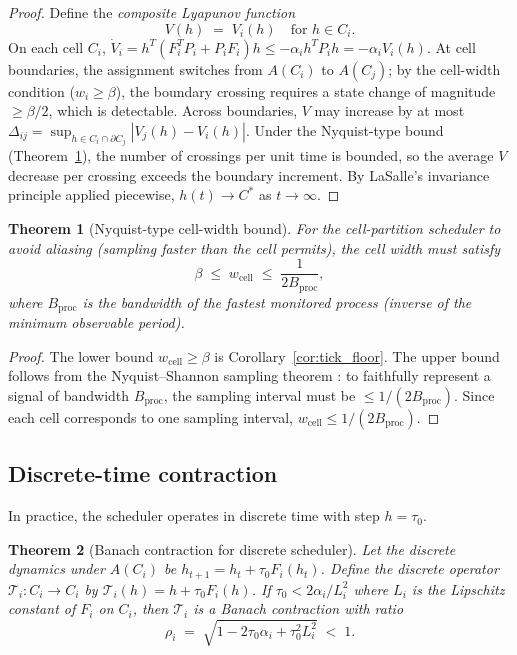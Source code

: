 \documentclass[11pt,twocolumn,a4paper]{article}
\theoremstyle{plain}
\newtheorem{theorem}{Theorem}[section]
\theoremstyle{definition}
\theoremstyle{remark}
\newcommand{\T}{\mathcal{T}}
\newcommand{\tick}{\tau_0}
\newcommand{\floor}{\beta}
\newcommand{\cell}{\mathrm{cell}}
\newcommand{\Lyap}{V}
\begin{document}
\begin{proof}
Define the \emph{composite Lyapunov function}
\[
  \Lyap(h) \;=\; \Lyap_i(h) \quad \text{for } h \in C_i.
\]
On each cell $C_i$, $\dot{\Lyap}_i = h^T(F_i^T P_i + P_i F_i)h \leq -\alpha_i h^T P_i h = -\alpha_i \Lyap_i(h)$. At cell boundaries, the assignment switches from $A(C_i)$ to $A(C_j)$; by the cell-width condition ($w_i \geq \floor$), the boundary crossing requires a state change of magnitude $\geq \floor/2$, which is detectable. Across boundaries, $\Lyap$ may increase by at most $\Delta_{ij} = \sup_{h \in C_i \cap \partial C_j} |\Lyap_j(h) - \Lyap_i(h)|$. Under the Nyquist-type bound (Theorem~\ref{thm:nyquist}), the number of crossings per unit time is bounded, so the average $\Lyap$ decrease per crossing exceeds the boundary increment. By LaSalle's invariance principle applied piecewise, $h(t) \to C^*$ as $t \to \infty$.
\end{proof}

\begin{theorem}[Nyquist-type cell-width bound]
\label{thm:nyquist}
For the cell-partition scheduler to avoid aliasing (sampling faster than the cell permits), the cell width must satisfy
\[
  \floor \;\leq\; w_{\cell} \;\leq\; \frac{1}{2 B_{\mathrm{proc}}},
\]
where $B_{\mathrm{proc}}$ is the bandwidth of the fastest monitored process (inverse of the minimum observable period).
\end{theorem}

\begin{proof}
The lower bound $w_{\cell} \geq \floor$ is Corollary~\ref{cor:tick_floor}. The upper bound follows from the Nyquist--Shannon sampling theorem \cite{shannon1948}: to faithfully represent a signal of bandwidth $B_{\mathrm{proc}}$, the sampling interval must be $\leq 1/(2 B_{\mathrm{proc}})$. Since each cell corresponds to one sampling interval, $w_{\cell} \leq 1/(2 B_{\mathrm{proc}})$.
\end{proof}

\subsection{Discrete-time contraction}

In practice, the scheduler operates in discrete time with step $h = \tick$.

\begin{theorem}[Banach contraction for discrete scheduler]
\label{thm:contraction}
Let the discrete dynamics under $A(C_i)$ be $h_{t+1} = h_t + \tick F_i(h_t)$. Define the discrete operator $\T_i : C_i \to C_i$ by $\T_i(h) = h + \tick F_i(h)$. If $\tick < 2\alpha_i / L_i^2$ where $L_i$ is the Lipschitz constant of $F_i$ on $C_i$, then $\T_i$ is a Banach contraction with ratio
\[
  \rho_i \;=\; \sqrt{1 - 2\tick\alpha_i + \tick^2 L_i^2} \;<\; 1.
\]
\end{theorem}
\end{document}
